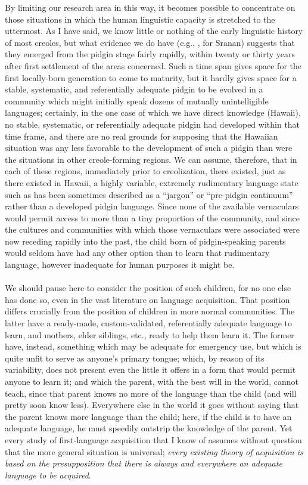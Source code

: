 By limiting our research area in this way, it becomes possible to concentrate on those situations in which the human linguistic capacity is stretched to the uttermost. As I have said, we know little or nothing of the early linguistic history of most creoles, but what evidence we do have (e.g., \citealt{Rens1953}, for Sranan) suggests that they emerged from the pidgin stage fairly rapidly, within twenty or thirty years after first settlement of the areas concerned. Such a time span gives space for the first locally-born generation to come to maturity, but it hardly gives space for a stable, systematic, and referentially adequate pidgin to be evolved in a community which might initially speak dozens of mutually unintelligible languages; certainly, in the one case of which we have direct knowledge (Hawaii), no stable, systematic, or referentially
adequate pidgin had developed within that time frame, and there are no real grounds for supposing that the Hawaiian situation was any less favorable to the development of such a pidgin than were the situations in other creole-forming regions. We can assume, therefore, that in each of these regions, immediately prior to creolization, there existed, just as there existed in Hawaii, a highly variable, extremely rudimentary language state such as has been sometimes described as a ``jargon'' or ``pre-pidgin continuum'' rather than a developed pidgin language. Since none of the available vernaculars would permit access to more than a tiny proportion of the community, and since the cultures and communities with which those vernaculars were associated were now receding rapidly into the past, the child born of pidgin-speaking parents would seldom have had any other option than to learn that rudi\-mentary language, however inadequate for human purposes it might be.\\\\
We should pause here to consider the position of such children, for no one else has done so, even in the vast literature on language acquisition. That position differs crucially from the position of children in more normal communities. The latter have a ready-made, custom-validated, referentially adequate language to learn, and mothers, elder siblings, etc., ready to help them learn it. The former have, instead, something which may be adequate for emergency use, but which is quite unfit to serve as anyone's primary tongue; which, by reason of its variability, does not present even the little it offers in a form that would permit anyone to learn it; and which the parent, with the best will in the world, cannot teach, since that parent knows no more of the language than the child (and will pretty soon know less). Every\-where else in the world it goes without saying that the parent knows more language than the child; here, if the child is to have an adequate language, he must speedily outstrip the knowledge of the parent. Yet every study of first-language acquisition that I know of assumes without question that the more general situation is universal; \textit{every existing theory of acquisition is based on the presupposition that there is always and everywhere an adequate language to be acquired}.

